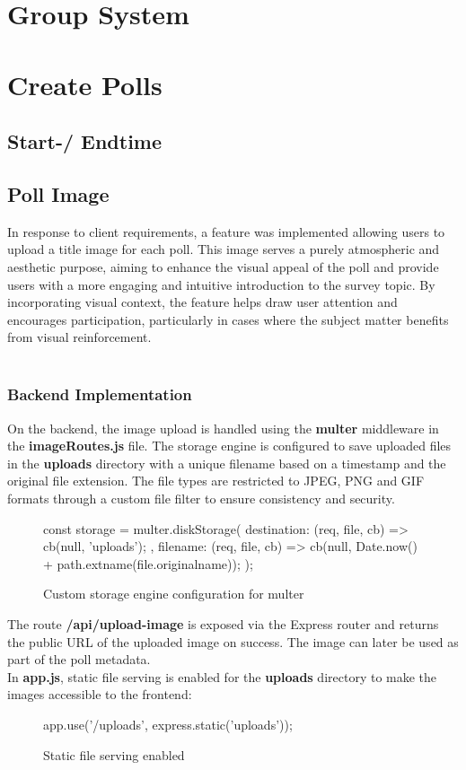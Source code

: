 \documentclass[a4paper,12pt]{report}
\begin{document}
\section{Group System}
\section{Create Polls}
\subsection{Start-/ Endtime}
\subsection{Poll Image}
In response to client requirements, a feature was implemented allowing users to upload a title image for each poll. This image serves a purely atmospheric and aesthetic purpose, aiming to enhance the visual appeal of the poll and provide users with a more engaging and intuitive introduction to the survey topic. By incorporating visual context, the feature helps draw user attention and encourages participation, particularly in cases where the subject matter benefits from visual reinforcement.\\\\
\subsubsection{Backend Implementation}
On the backend, the image upload is handled using the \textbf{multer} middleware in the \textbf{imageRoutes.js} file. The storage engine is configured to save uploaded files in the \textbf{uploads} directory with a unique filename based on a timestamp and the original file extension. The file types are restricted to JPEG, PNG and GIF formats through a custom file filter to ensure consistency and security.\parencite{expressmulter}
\begin{figure}[H]
	\begin{code}
		const storage = multer.diskStorage({
			destination: (req, file, cb) => {
				cb(null, 'uploads');
			},
			filename: (req, file, cb) => {
				cb(null, Date.now() + path.extname(file.originalname));
			}
		});
	\end{code}
	\caption{Custom storage engine configuration for multer}
	\label{fig:multer_config}
\end{figure}
The route \textbf{/api/upload-image} is exposed via the Express router and returns the public URL of the uploaded image on success. The image can later be used as part of the poll metadata.\\
In \textbf{app.js}, static file serving is enabled for the \textbf{uploads} directory to make the images accessible to the frontend:
\begin{figure}[H]
	\begin{code}
		app.use('/uploads', express.static('uploads'));
	\end{code}
	\caption{Static file serving enabled}
	\label{fig:static_file_serving}
\end{figure}
\end{document}
